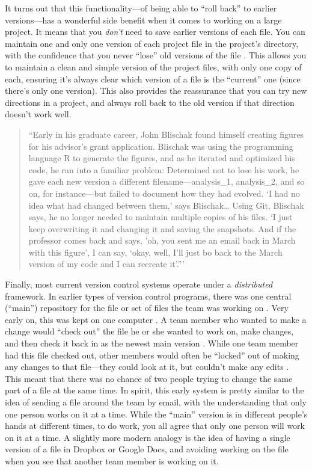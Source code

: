 \documentclass[]{tufte-book}
\begin{document}
It turns out that this functionality---of being able to ``roll back'' to earlier
versions---has a wonderful side benefit when it comes to working on a large
project. It means that you \emph{don't} need to save earlier versions of each file.
You can maintain one and only one version of each project file in the project's
directory, with the confidence that you never ``lose'' old versions of the file
\citep{perkel2018git, blischak2016quick}. This allows you to maintain a clean and
simple version of the project files, with only one copy of each, ensuring it's
always clear which version of a file is the ``current'' one (since there's only
one version). This also provides the reassurance that you can try new directions
in a project, and always roll back to the old version if that direction doesn't
work well.

\begin{quote}
``Early in his graduate career, John Blischak found himself creating figures
for his advisor's grant application. Blischak was using the programming language
R to generate the figures, and as he iterated and optimized his code, he ran
into a familiar problem: Determined not to lose his work, he gave each new
version a different filename---analysis\_1, analysis\_2, and so on, for
instance---but failed to document how they had evolved. `I had no idea what had
changed between them,' says Blischak\ldots{} Using Git, Blischak says, he no longer
needed to maintain multiple copies of his files. `I just keep overwriting it and
changing it and saving the snapshots. And if the professor comes back and says,
'oh, you sent me an email back in March with this figure', I can say, `okay,
well, I'll just bo back to the March version of my code and I can recreate
it'.''' \citep{perkel2018git}
\end{quote}

Finally, most current version control systems operate under a \emph{distributed}
framework. In earlier types of version control programs, there was one central
(``main'') repository for the file or set of files the team was working on
\citep{raymondunderstanding, target2018version}. Very early on, this was kept on one
computer \citep{irving2011astonishments}. A team member who wanted to make a change
would ``check out'' the file he or she wanted to work on, make changes, and then
check it back in as the newest main version \citep{raymond2003art}. While one team
member had this file checked out, other members would often be ``locked'' out of
making any changes to that file---they could look at it, but couldn't make any
edits \citep{raymondunderstanding, target2018version}. This meant that there was no
chance of two people trying to change the same part of a file at the same time.
In spirit, this early system is pretty similar to the idea of sending a file
around the team by email, with the understanding that only one person works on
it at a time. While the ``main'' version is in different people's hands at
different times, to do work, you all agree that only one person will work on it
at a time. A slightly more modern analogy is the idea of having a single version
of a file in Dropbox or Google Docs, and avoiding working on the file when you
see that another team member is working on it.
\end{document}
